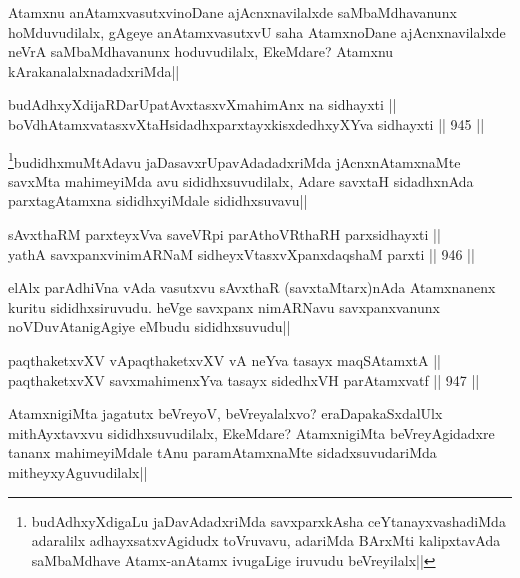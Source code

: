 \begin{artha}
Atamxnu anAtamxvasutxvinoDane ajAcnxnavilalxde saMbaMdhavanunx hoMduvudilalx, gAgeye anAtamxvasutxvU saha AtamxnoDane ajAcnxnavilalxde neVrA saMbaMdhavanunx hoduvudilalx, EkeMdare? Atamxnu kArakanalalxnadadxriMda||
\end{artha}


\begin{shl}
budAdhxyXdijaRDarUpatAvxtasxvXmahimAnx na sidhayxti || \\
boVdhAtamxvatasxvXtaHsidadhxparxtayxkisxdedhxyXYva sidhayxti ||  945 ||  
\end{shl}

\begin{artha}
\footnote{budAdhxyXdigaLu jaDavAdadxriMda savxparxkAsha ceYtanayxvashadiMda adaralilx adhayxsatxvAgidudx toVruvavu, adariMda BArxMti kalipxtavAda saMbaMdhave Atamx-anAtamx ivugaLige iruvudu beVreyilalx||}budidhxmuMtAdavu jaDasavxrUpavAdadadxriMda jAcnxnAtamxnaMte savxMta mahimeyiMda avu sididhxsuvudilalx, Adare savxtaH sidadhxnAda parxtagAtamxna sididhxyiMdale sididhxsuvavu||
\end{artha}


\begin{shl}
sAvxthaRM parxteyxVva saveVR\s pi parAthoVR\s thaRH parxsidhayxti || \\
yathA savxpanxvinimARNaM sidheyxVtasxvXpanxdaqshaM parxti ||  946 ||  
\end{shl}

\begin{artha}
elAlx parAdhiVna vAda vasutxvu sAvxthaR (savxtaMtarx)nAda Atamxnanenx kuritu sididhxsiruvudu. heVge savxpanx nimARNavu savxpanxvanunx noVDuvAtanigAgiye eMbudu sididhxsuvudu||
\end{artha}


\begin{shl}
paqthaketxvXV vA\s paqthaketxvXV vA neYva tasayx maqSAtamxtA || \\
paqthaketxvXV savxmahimenxYva tasayx sidedhxVH parAtamxvatf ||  947 ||  
\end{shl}

\begin{artha}
AtamxnigiMta jagatutx beVreyoV, beVreyalalxvo? eraDapakaSxdalUlx mithAyxtavxvu sididhxsuvudilalx, EkeMdare? AtamxnigiMta beVreyAgidadxre tananx mahimeyiMdale tAnu paramAtamxnaMte sidadxsuvudariMda mitheyxyAguvudilalx||
\end{artha}

